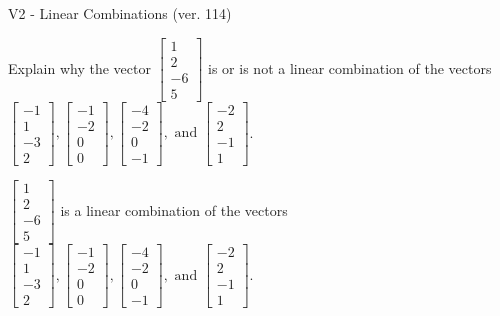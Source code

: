 \begin{exercise}
  \begin{exerciseTitle}V2 - Linear Combinations (ver. 114)\end{exerciseTitle}
  \begin{exerciseStatement}
    Explain why the vector \(\left[\begin{array}{c}
1 \\
2 \\
-6 \\
5
\end{array}\right]\)  is or is not a linear 
	combination of the vectors \(\left[\begin{array}{c}
-1 \\
1 \\
-3 \\
2
\end{array}\right] , \left[\begin{array}{c}
-1 \\
-2 \\
0 \\
0
\end{array}\right] , \left[\begin{array}{c}
-4 \\
-2 \\
0 \\
-1
\end{array}\right] , \text{ and } \left[\begin{array}{c}
-2 \\
2 \\
-1 \\
1
\end{array}\right]\).
	


  \end{exerciseStatement}
  \begin{exerciseAnswer}
   \(\left[\begin{array}{c}
1 \\
2 \\
-6 \\
5
\end{array}\right]\) 
  	 is  
	a linear combination of the vectors \(\left[\begin{array}{c}
-1 \\
1 \\
-3 \\
2
\end{array}\right] , \left[\begin{array}{c}
-1 \\
-2 \\
0 \\
0
\end{array}\right] , \left[\begin{array}{c}
-4 \\
-2 \\
0 \\
-1
\end{array}\right] , \text{ and } \left[\begin{array}{c}
-2 \\
2 \\
-1 \\
1
\end{array}\right]\).


\end{exerciseAnswer}
\end{exercise}
